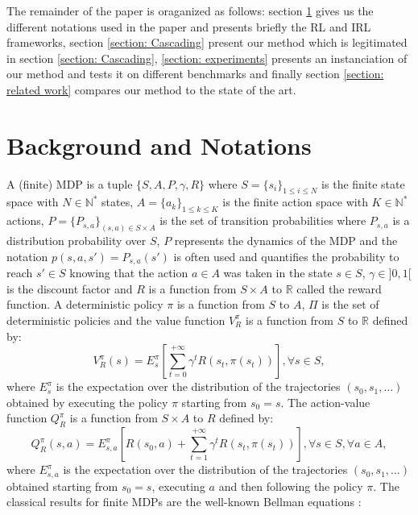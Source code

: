 \documentclass{article} %
\newcommand{\0}{\mathbf{0}}
\newcommand{\1}{\mathbf{1}}
\begin{document}
The remainder of the paper is oraganized as follows: section \ref{section: background} gives us the different notations used in the paper and presents briefly the RL and IRL frameworks, section \ref{section: Cascading} present our method which is legitimated in section \ref{section: Cascading}, \ref{section: experiments} presents an instanciation of our method and tests it on different benchmarks and finally section \ref{section: related work} compares our method to the state of the art.

\section{Background and Notations}
\label{section: background}
A (finite) MDP \cite{puterman1994markov} is a tuple $\{S,A,P,\gamma,R\}$ where $S=\{s_i\}_{1\leq i \leq N}$ is the finite state space with $N\in\mathbb{N}^*$ states, $A=\{a_k\}_{1\leq k \leq K}$ is the finite action space with $K\in\mathbb{N}^*$ actions, $P=\{P_{s,a}\}_{(s,a)\in S\times A}$ is the set of transition probabilities where $P_{s,a}$ is a distribution probability over $S$, $P$ represents the dynamics of the MDP and the notation $p(s,a,s')=P_{s,a}(s')$ is often used and quantifies the probability to reach $s'\in S$ knowing that the action $a \in A$ was taken in the state $s\in S$, $\gamma\in]0,1[$ is the discount factor and $R$ is a function from $S\times A$ to $\mathbb{R}$ called the reward function. A deterministic policy $\pi$ is a function from $S$ to $A$, $\Pi$ is the set of deterministic policies and the value function $V^\pi_R$ is a function from $S$ to $\mathbb{R}$ defined by:
\begin{equation}
V^\pi_R(s)=E^\pi_s[\sum_{t=0}^{+\infty}\gamma^tR(s_t,\pi(s_t))], \forall s \in S,
\end{equation}
where $E^\pi_s$ is the expectation over the distribution of the trajectories $(s_0,s_1,\dots)$ obtained by executing the policy $\pi$ starting from $s_0=s$.
The action-value function $Q^\pi_R$ is a function from $S\times A$ to $R$ defined by:
\begin{equation}
Q^\pi_R(s,a)=E^\pi_{s,a}[R(s_0,a)+\sum_{t=1}^{+\infty}\gamma^tR(s_t,\pi(s_t))], \forall s \in S,\forall a \in A,
\end{equation}
where $E^\pi_{s,a}$ is the expectation over the distribution of the trajectories $(s_0,s_1,\dots)$ obtained starting from $s_0=s$, executing $a$ and then following the policy $\pi$.
The classical results for finite MDPs are the well-known Bellman equations \cite{sutton1998reinforcement}:
\end{document}
